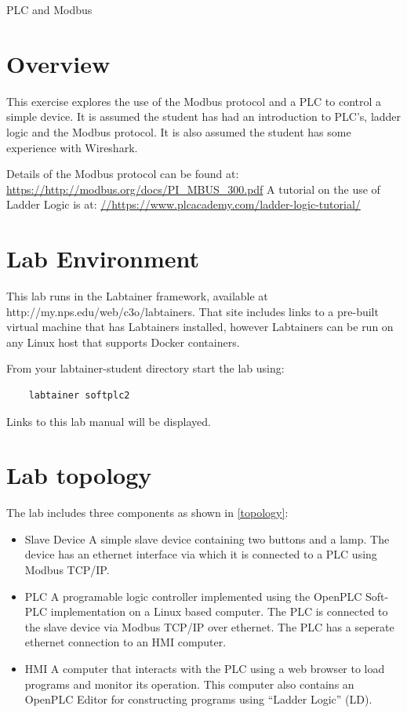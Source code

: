


\begin{center}
{\LARGE PLC and Modbus}
\vspace{0.1in}\\
\end{center}


\section{Overview}
This exercise explores the use of the Modbus protocol and a
PLC to control a simple device.
It is assumed the student has had an introduction to PLC's, ladder logic and 
the Modbus protocol.  It is also assumed the student has some experience with
Wireshark.

Details of the Modbus protocol can be found at:
\url {https://http://modbus.org/docs/PI\_MBUS\_300.pdf}
A tutorial on the use of Ladder Logic is at:
\url {//https://www.plcacademy.com/ladder-logic-tutorial/}


\section{Lab Environment}
This lab runs in the Labtainer framework,
available at http://my.nps.edu/web/c3o/labtainers.
That site includes links to a pre-built virtual machine
that has Labtainers installed, however Labtainers can
be run on any Linux host that supports Docker containers.

From your labtainer-student directory start the lab using:
\begin{verbatim}
    labtainer softplc2
\end{verbatim}
Links to this lab manual will be displayed.  

\section{Lab topology}
The lab includes three components as shown in \ref{topology}:
\begin{itemize}
\item{Slave Device} A simple slave device containing two buttons and a lamp.  The device has an
ethernet interface via which it is connected to a PLC using Modbus TCP/IP.
\item{PLC} A programable logic controller implemented using the OpenPLC Soft-PLC implementation
on a Linux based computer.  The PLC is connected to the slave device via Modbus TCP/IP over ethernet.
The PLC has a seperate ethernet connection to an HMI computer.
\item{HMI} A computer that interacts with the PLC using a web browser to load programs and monitor its operation.  This
computer also contains an OpenPLC Editor for constructing programs using ``Ladder Logic'' (LD).
\end{itemize}


